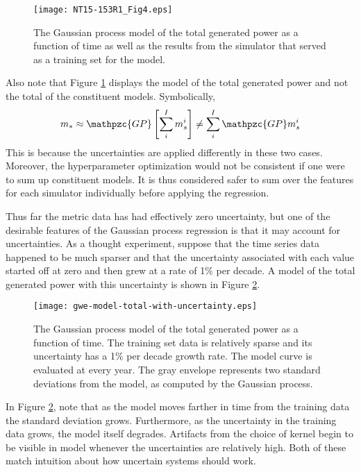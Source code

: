 \documentclass{ntmanuscript}
\newcommand{\GP}{\mathpzc{GP}}
\begin{document}
\begin{figure}[htb]
\centering
\texttt{[image: NT15-153R1\_Fig4.eps]}
\caption{The Gaussian process model of the total generated power
as a function of time as well as the results from the simulator that served as a
training set for the model.}
\label{gwe-model-total}
\end{figure}

\clearpage

Also note that Figure \ref{gwe-model-total} displays the model of the total
generated power and not the total of the constituent models. Symbolically,
\begin{equation}
\label{total-model}
m_* \approx \GP \left[\sum_i^I m_s^i\right] \ne \sum_i^I \GP m_s^i
\end{equation}
This is because the uncertainties are applied differently in these two cases.
Moreover, the hyperparameter
optimization would not be consistent if one were to sum up constituent
models. It is thus considered safer
to sum over the features for each simulator individually before applying the
regression.

Thus far the metric data has had effectively zero uncertainty, but one of the
desirable features of the Gaussian process regression is that it may account
for uncertainties. As a thought experiment, suppose that the time
series data happened to be much sparser and that
the uncertainty associated with each value started off at zero and then grew at
a rate of 1\% per decade. A model of the total generated power with this uncertainty
is shown in Figure \ref{gwe-model-total-with-uncertainty}.

\begin{figure}[htb]
\centering
\texttt{[image: gwe-model-total-with-uncertainty.eps]}
\caption{The Gaussian process model of the total generated power
as a function of time. The training set data is relatively sparse and its uncertainty
has a 1\% per decade growth rate. The model curve is evaluated at every year. The
gray envelope represents two standard deviations from the model, as computed by
the Gaussian process.}
\label{gwe-model-total-with-uncertainty}
\end{figure}

In Figure \ref{gwe-model-total-with-uncertainty}, note that as the model moves
farther in time from the training data the standard deviation grows. Furthermore,
as the uncertainty in the training data grows, the model itself degrades. Artifacts
from the choice of kernel begin to be visible in model whenever the uncertainties are
relatively high. Both of these match intuition about how uncertain systems should
work.
\end{document}
